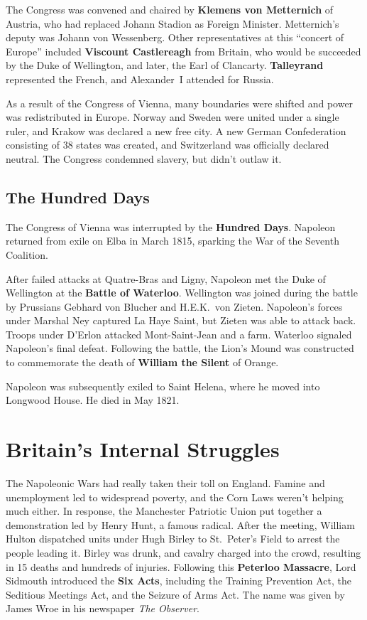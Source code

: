 The Congress was convened and chaired by \textbf{Klemens von Metternich} of Austria,
who had replaced Johann Stadion as Foreign Minister.
Metternich's deputy was Johann von Wessenberg.
Other representatives at this ``concert of Europe'' included
\textbf{Viscount Castlereagh} from Britain,
who would be succeeded by the Duke of Wellington,
and later, the Earl of Clancarty.
\textbf{Talleyrand} represented the French, and Alexander~I attended for Russia.

As a result of the Congress of Vienna, many boundaries were shifted and power was redistributed in Europe.
Norway and Sweden were united under a single ruler, and Krakow was declared a new free city.
A new German Confederation consisting of 38 states was created, and Switzerland was officially declared neutral.
The Congress condemned slavery, but didn't outlaw it.

\subsection*{The Hundred Days}

The Congress of Vienna was interrupted by the \textbf{Hundred Days}.
Napoleon returned from exile on Elba in March 1815,
sparking the War of the Seventh Coalition.

After failed attacks at Quatre-Bras and Ligny,
Napoleon met the Duke of Wellington at the \textbf{Battle of Waterloo}.
Wellington was joined during the battle by Prussians Gebhard von Blucher and H.E.K.\ von Zieten.
Napoleon's forces under Marshal Ney captured La Haye Saint, but Zieten was able to attack back.
Troops under D'Erlon attacked Mont-Saint-Jean and a farm.
Waterloo signaled Napoleon's final defeat.
Following the battle,
the Lion's Mound was constructed to commemorate the death of \textbf{William the Silent} of Orange.

Napoleon was subsequently exiled to Saint Helena, where he moved into Longwood House.
He died in May 1821.

\section{Britain's Internal Struggles}

The Napoleonic Wars had really taken their toll on England.
Famine and unemployment led to widespread poverty, and the Corn Laws weren't helping much either.
In response, the Manchester Patriotic Union put together a demonstration led by Henry Hunt, a famous radical.
After the meeting,
William Hulton dispatched units under Hugh Birley to St.\ Peter's Field to arrest the people leading it.
Birley was drunk, and cavalry charged into the crowd, resulting in 15 deaths and hundreds of injuries.
Following this \textbf{Peterloo Massacre},
Lord Sidmouth introduced the \textbf{Six Acts}, including
the Training Prevention Act,
the Seditious Meetings Act,
and the Seizure of Arms Act.
The name was given by James Wroe in his newspaper \textit{The Observer}.

